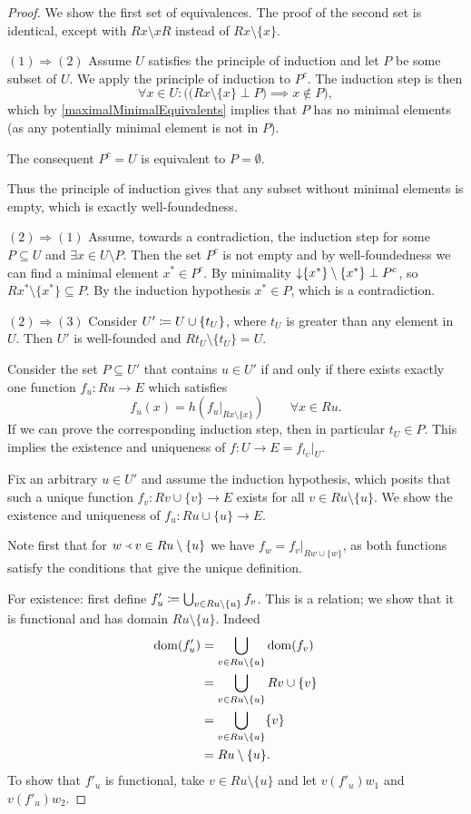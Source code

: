 \begin{proof}
We show the first set of equivalences. The proof of the second set is identical, except with $Rx\setminus xR$ instead of $Rx\setminus\{x\}$.

$\boxed{(1) \Rightarrow (2)}$ Assume $U$ satisfies the principle of induction and let $P$ be some subset of $U$. We apply the principle of induction to $P^c$. The induction step is then
\[ \forall x\in U: \Big(\big(Rx\setminus\{x\}\perp P\big)\implies x\notin P\Big), \]
which by \ref{maximalMinimalEquivalents} implies that $P$ has no minimal elements (as any potentially minimal element is not in $P$).

The consequent $P^c = U$ is equivalent to $P=\emptyset$.

Thus the principle of induction gives that any subset without minimal elements is empty, which is exactly well-foundedness.

$\boxed{(2) \Rightarrow (1)}$ Assume, towards a contradiction, the induction step for some $P\subseteq U$ and $\exists x\in U\setminus P$. Then the set $P^c$ is not empty and by well-foundedness we can find a minimal element $x^*\in P^c$. By minimality $\operatorname{\downarrow}\{x^*\}\setminus\{x^*\}\perp P^c$, so $R{x^*}\setminus\{x^*\}\subseteq P$. By the induction hypothesis $x^*\in P$, which is a contradiction.

$\boxed{(2) \Rightarrow (3)}$ Consider $U' \coloneqq U\cup \{t_U\}$, where $t_U$ is greater than any element in $U$. Then $U'$ is well-founded and $Rt_U\setminus \{t_U\} = U$.

Consider the set $P\subseteq U'$ that contains $u\in U'$ if and only if there exists exactly one function $f_u:Ru\to E$ which satisfies
\[ f_u(x) = h(f_u|_{Rx\setminus\{x\}}) \qquad \forall x\in Ru. \]
If we can prove the corresponding induction step, then in particular $t_U\in P$. This implies the existence and uniqueness of $f:U\to E = f_{t_U}|_U$.

Fix an arbitrary $u\in U'$ and assume the induction hypothesis, which posits that such a unique function $f_v: Rv\cup\{v\}\to E$ exists for all $v\in Ru\setminus\{u\}$. We show the existence and uniqueness of $f_u:Ru\cup \{u\}\to E$.

Note first that for $w\Yleft v\in Ru\setminus\{u\}$ we have $f_w = f_v|_{Rw\cup\{w\}}$, as both functions satisfy the conditions that give the unique definition.

For existence: first define $f_u' \coloneqq \bigcup_{v\in Ru\setminus\{u\}} f_v$. 
This is a relation; we show that it is functional and has domain $Ru\setminus\{u\}$.
Indeed
\begin{align*}
\operatorname{dom}(f'_u) &= \bigcup_{v\in Ru\setminus\{u\}} \operatorname{dom}(f_v) \\
&= \bigcup_{v\in Ru\setminus\{u\}} Rv\cup\{v\} \\
&= \bigcup_{v\in Ru\setminus\{u\}} \{v\} \\
&= Ru\setminus\{u\}.
\end{align*}
To show that $f'_u$ is functional, take $v\in Ru\setminus\{u\}$ and let $v\mathrel{(f'_u)}w_1$ and $v\mathrel{(f'_u)}w_2$.


\end{proof}
